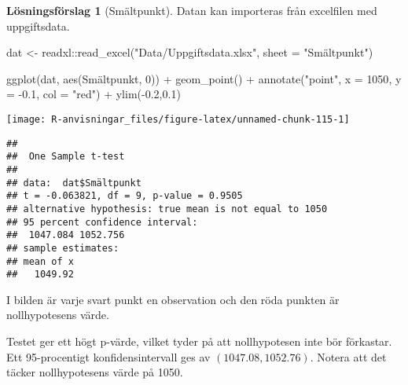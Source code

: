 \documentclass[
]{book}
\newenvironment{Shaded}{\begin{snugshade}}{\end{snugshade}}
\newcommand{\AttributeTok}[1]{\textcolor[rgb]{0.77,0.63,0.00}{#1}}
\newcommand{\DecValTok}[1]{\textcolor[rgb]{0.00,0.00,0.81}{#1}}
\newcommand{\FloatTok}[1]{\textcolor[rgb]{0.00,0.00,0.81}{#1}}
\newcommand{\FunctionTok}[1]{\textcolor[rgb]{0.00,0.00,0.00}{#1}}
\newcommand{\NormalTok}[1]{#1}
\newcommand{\OtherTok}[1]{\textcolor[rgb]{0.56,0.35,0.01}{#1}}
\newcommand{\SpecialCharTok}[1]{\textcolor[rgb]{0.00,0.00,0.00}{#1}}
\newcommand{\StringTok}[1]{\textcolor[rgb]{0.31,0.60,0.02}{#1}}
\theoremstyle{definition}
\theoremstyle{definition}
\theoremstyle{definition}
\theoremstyle{definition}
\newtheorem{hypothesis}{Lösningsförslag}[chapter]
\theoremstyle{remark}
\begin{document}
\begin{hypothesis}[Smältpunkt]
Datan kan importeras från excelfilen med uppgiftsdata.

\begin{Shaded}
\begin{Highlighting}[]
\NormalTok{dat }\OtherTok{\textless{}{-}}\NormalTok{ readxl}\SpecialCharTok{::}\FunctionTok{read\_excel}\NormalTok{(}\StringTok{"Data/Uppgiftsdata.xlsx"}\NormalTok{, }\AttributeTok{sheet =} \StringTok{"Smältpunkt"}\NormalTok{)}

\FunctionTok{ggplot}\NormalTok{(dat, }\FunctionTok{aes}\NormalTok{(Smältpunkt, }\DecValTok{0}\NormalTok{)) }\SpecialCharTok{+}
  \FunctionTok{geom\_point}\NormalTok{() }\SpecialCharTok{+}
  \FunctionTok{annotate}\NormalTok{(}\StringTok{"point"}\NormalTok{, }\AttributeTok{x =} \DecValTok{1050}\NormalTok{, }\AttributeTok{y =} \SpecialCharTok{{-}}\FloatTok{0.1}\NormalTok{, }\AttributeTok{col =} \StringTok{"red"}\NormalTok{) }\SpecialCharTok{+}
  \FunctionTok{ylim}\NormalTok{(}\SpecialCharTok{{-}}\FloatTok{0.2}\NormalTok{,}\FloatTok{0.1}\NormalTok{)}
\end{Highlighting}
\end{Shaded}

\begin{center}\texttt{[image: R-anvisningar\_files/figure-latex/unnamed-chunk-115-1]} \end{center}

\begin{Shaded}
\end{Shaded}

\begin{verbatim}
## 
##  One Sample t-test
## 
## data:  dat$Smältpunkt
## t = -0.063821, df = 9, p-value = 0.9505
## alternative hypothesis: true mean is not equal to 1050
## 95 percent confidence interval:
##  1047.084 1052.756
## sample estimates:
## mean of x 
##   1049.92
\end{verbatim}

I bilden är varje svart punkt en observation och den röda punkten är nollhypotesens värde.

Testet ger ett högt p-värde, vilket tyder på att nollhypotesen inte bör förkastar. Ett 95-procentigt konfidensintervall ges av \((1047.08, 1052.76)\). Notera att det täcker nollhypotesens värde på 1050.
\end{hypothesis}
\end{document}
